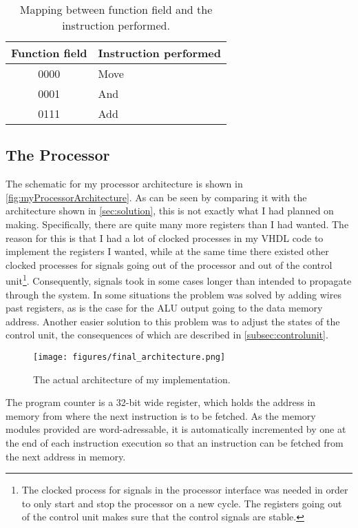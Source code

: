 \documentclass[11pt]{article}
\begin{document}
\begin{table}[htbp]
  \centering
  \begin{tabular}{|c|p{50pt}|}
    \hline
    {\bf Function field} & {\bf Instruction performed} \\ \hline
    0000 & Move \\ \hline
    0001 & And \\ \hline
    0111 & Add \\ \hline
  \end{tabular}
  \caption{Mapping between function field and the instruction performed.}
  \label{tab:funcMapping}
\end{table}


\subsection{The Processor}
\label{subsec:processor}
The schematic for my processor architecture is shown in
\autoref{fig:myProcessorArchitecture}. As can be seen by comparing it
with the architecture shown in \autoref{sec:solution}, this is not
exactly what I had planned on making. Specifically, there are quite
many more registers than I had wanted. The reason for this is that I
had a lot of clocked processes in my VHDL code to implement the
registers I wanted, while at the same time there existed other clocked
processes for signals going out of the processor and out of the
control unit\footnote{The clocked process for signals in the processor
  interface was needed in order to only start and stop the processor
  on a new cycle. The registers going out of the control unit makes
  sure that the control signals are stable.}. Consequently, signals
took in some cases longer than intended to propagate through the
system. In some situations the problem was solved by adding wires past
registers, as is the case for the ALU output going to the data memory
address. Another easier solution to this problem was to adjust the
states of the control unit, the consequences of which are described in
\autoref{subsec:controlunit}.

\begin{figure}[ht]
  \centering
  \texttt{[image: figures/final\_architecture.png]}
  \caption{\label{fig:myProcessorArchitecture} The actual architecture of my implementation.}
\end{figure}


The program counter is a 32-bit wide register, which holds the address
in memory from where the next instruction is to be fetched. As the
memory modules provided are word-adressable, it is automatically
incremented by one at the end of each instruction execution so that an
instruction can be fetched from the next address in memory. 
\end{document}
